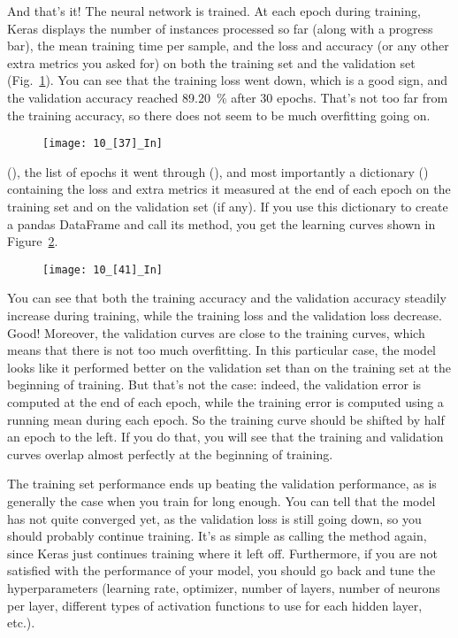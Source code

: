 And that's it! The neural network is trained. At each epoch during training, Keras displays the number of instances processed so far (along with a progress bar), the mean training time per sample, and the loss and accuracy (or any other extra metrics you asked for) on both the training set and the validation set (Fig.~\ref{10_[37]_In}). You can see that the training loss went down, which is a good sign, and the validation accuracy reached \SI{89.20}{\percent} after 30 epochs. That's not too far from the training accuracy, so there does not seem to be much overfitting going on.
\begin{figure}[h!t]
\centering
\texttt{[image: 10\_[37]\_In]}
\caption{}\label{10_[37]_In}
\end{figure}

 (), the list of epochs it went through (), and most importantly a dictionary () containing the loss and extra metrics it measured at the end of each epoch on the training set and on the validation set (if any). If you use this dictionary to create a pandas DataFrame and call its  method, you get the learning curves shown in Figure~\ref{10_[41]_In}.
\begin{figure}[h!t]
\centering
\texttt{[image: 10\_[41]\_In]}
\caption{}\label{10_[41]_In}
\end{figure}

You can see that both the training accuracy and the validation accuracy steadily increase during training, while the training loss and the validation loss decrease. Good! Moreover, the validation curves are close to the training curves, which means that there is not too much overfitting. In this particular case, the model looks like it performed better on the validation set than on the training set at the beginning of training. But that's not the case: indeed, the validation error is computed at the end of each epoch, while the training error is computed using a running mean during each epoch. So the training curve should be shifted by half an epoch to the left. If you do that, you will see that the training and validation curves overlap almost perfectly at the beginning of training.

The training set performance ends up beating the validation performance, as is generally the case when you train for long enough. You can tell that the model has not quite converged yet, as the validation loss is still going down, so you should probably continue training. It's as simple as calling the  method again, since Keras just continues training where it left off.
Furthermore, if you are not satisfied with the performance of your model, you should go back and tune the hyperparameters (learning rate, optimizer, number of layers, number of neurons per layer, different types of activation functions to use for each hidden layer, etc.).
